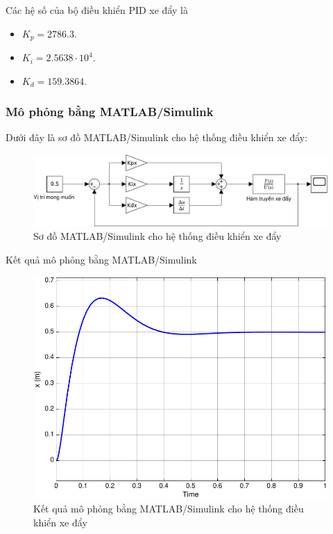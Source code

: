 \documentclass[12pt,a4paper]{article}
\begin{document}
Các hệ số của bộ điều khiển PID xe đẩy là
\begin{itemize}
    \item $K_p = 2786.3$.
    \item $K_i = 2.5638\cdot 10^4$.
    \item $K_d = 159.3864 $.
\end{itemize}

\subsubsection{Mô phỏng bằng MATLAB/Simulink}

Dưới đây là sơ đồ MATLAB/Simulink cho hệ thống điều khiển xe đẩy:
\newpage
\begin{figure}[ht]
    \centering
    \includegraphics[width=\linewidth]{MATLAB_7.pdf}
    \caption{Sơ đồ MATLAB/Simulink cho hệ thống điều khiển xe đẩy}
\end{figure}

Kết quả mô phỏng bằng MATLAB/Simulink
\begin{figure}[ht]
    \centering
    \includegraphics[width=\linewidth]{MATLAB_6.pdf}
    \caption{Kết quả mô phỏng bằng MATLAB/Simulink cho hệ thống điều khiển xe đẩy}
\end{figure}
\end{document}
